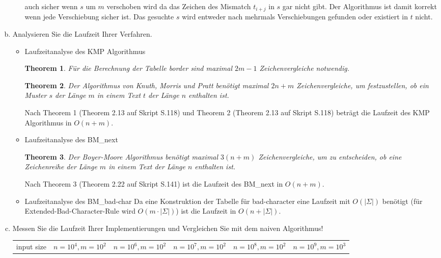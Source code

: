 \documentclass{article}
\newtheorem{theorem}{Theorem}
\begin{document}
\begin{flushleft}
\begin{enumerate}[(a)]
\begin{itemize}
        auch sicher wenn $s$ um $m$ verschoben wird da das Zeichen des Mismatch $t_{i + j}$ in $s$ gar nicht gibt. 
        Der Algorithmus ist damit korrekt wenn jede Verschiebung sicher ist. Das gesuchte $s$ wird entweder nach mehrmals Verschiebungen
        gefunden oder existiert in $t$ nicht. 
    \end{itemize}
    \item Analysieren Sie die Laufzeit Ihrer Verfahren.
    \begin{itemize}
        \item Laufzeitanalyse des KMP Algorithmus
        \begin{theorem}
            Für die Berechnung der Tabelle border sind maximal $2m − 1$ Zeichenvergleiche
            notwendig.
        \end{theorem}
        \begin{theorem}
            Der Algorithmus von Knuth, Morris und Pratt benötigt maximal $2n + m$ Zeichenvergleiche, um festzustellen,
            ob ein Muster $s$ der Länge $m$ in einem Text $t$ der Länge $n$ enthalten ist.
        \end{theorem}
        Nach Theorem 1 (Theorem 2.13 auf Skript S.118) und Theorem 2 (Theorem 2.13 auf Skript S.118) beträgt die Laufzeit des KMP Algorithmus in $O(n + m)$.
        \item Laufzeitanalyse des BM\_next
        \begin{theorem}
            Der Boyer-Moore Algorithmus benötigt maximal $3(n+m)$ Zeichenvergleiche, um zu entscheiden, 
            ob eine Zeichenreihe der Länge $m$ in einem Text der Länge $n$ enthalten ist.
        \end{theorem}
        Nach Theorem 3 (Theorem 2.22 auf Skript S.141) ist die Laufzeit des BM\_next in $O(n + m)$.
        \item Laufzeitanalyse des BM\_bad-char
        \newline Da eine Konstruktion der Tabelle für bad-character eine Laufzeit mit $O(|\Sigma|)$ benötigt 
        (für Extended-Bad-Character-Rule wird $O(m \cdot |\Sigma|)$) ist die Laufzeit in $O(n + |\Sigma|)$.
    \end{itemize}
    \item Messen Sie die Laufzeit Ihrer Implementierungen und Vergleichen Sie mit dem naiven Algorithmus!
    \newline \\
    \begin{tabular}{||l|c|c|c|c|c||}
        \hline input size & $n = 10^4, m = 10^2$ & $n = 10^6, m = 10^2$ & $n = 10^7, m = 10^2$ & $n = 10^8, m = 10^2$ & $n = 10^9, m = 10^3$\\

\end{tabular}
\end{enumerate}
\end{flushleft}
\end{document}
